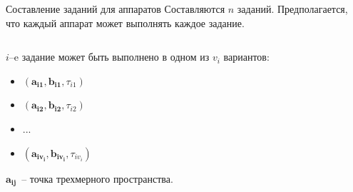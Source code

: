 \documentclass{beamer}
\begin{document}


\begin{frame}{Составление заданий для аппаратов}
Составляются $n$ заданий. Предполагается, что каждый аппарат может выполнять каждое задание.
\begin{columns}[onlytextwidth, t]
    \begin{column}{0.6\textwidth}

        $i$--e задание может быть выполнено в одном из $v_i$ вариантов:
        \begin{itemize}
        \item $(\mathbf{a_{i 1}}, \mathbf{b_{i 1}}, \tau_{i 1})$
        \item $(\mathbf{a_{i 2}}, \mathbf{b_{i 2}}, \tau_{i 2})$
        \item $...$
        \item $(\mathbf{a_{i v_i}}, \mathbf{b_{i v_i}}, \tau_{i v_i})$
        \end{itemize}
        $\mathbf{a_{i j}}$~-- точка трехмерного пространства.
    \end{column}
    \begin{column}{0.4\textwidth}

    \end{column}

​\end{columns}
\end{frame}
\end{document}
